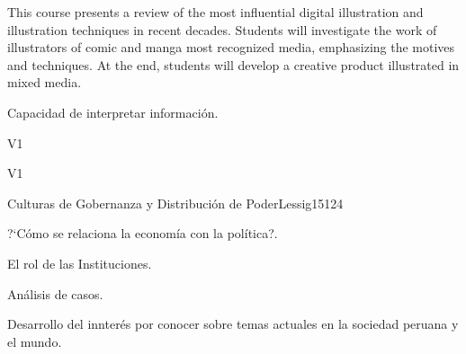 \begin{syllabus}


\begin{justification}
This course presents a review of the most influential digital illustration and illustration techniques in recent decades. Students will investigate the work of illustrators of comic and manga most recognized media, emphasizing the motives and techniques. At the end, students will develop a creative product illustrated in mixed media.
\end{justification}

\begin{goals}
\item Capacidad de interpretar información.
\end{goals}

\begin{outcomes}{V1}
    \item {}
    \item {}
    \item {}
    
\end{outcomes}

\begin{competences}{V1}
    \item {}
    \item {}
    \item {}
    \item {}
\end{competences}

\begin{unit}{Culturas de Gobernanza y Distribución de Poder}{}{Lessig15}{12}{4}
   \begin{topics}
      \item ?`Cómo se relaciona la economía con la política?.
      \item El rol de las Instituciones.
      \item Análisis de casos.
   \end{topics}
   \begin{learningoutcomes}
      \item Desarrollo del innterés por conocer sobre temas actuales en la sociedad peruana y el mundo.
   \end{learningoutcomes}
\end{unit}

\begin{coursebibliography}
\end{coursebibliography}

\end{syllabus}
